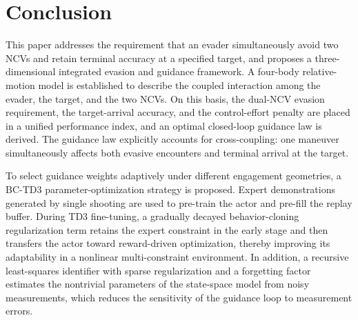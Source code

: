 %
\section{Conclusion}
This paper addresses the requirement that an evader simultaneously avoid two NCVs and retain terminal accuracy at a specified target, and proposes a three-dimensional integrated evasion and guidance framework. A four-body relative-motion model is established to describe the coupled interaction among the evader, the target, and the two NCVs. On this basis, the dual-NCV evasion requirement, the target-arrival accuracy, and the control-effort penalty are placed in a unified performance index, and an optimal closed-loop guidance law is derived. The guidance law explicitly accounts for cross-coupling: one maneuver simultaneously affects both evasive encounters and terminal arrival at the target.

To select guidance weights adaptively under different engagement geometries, a BC-TD3 parameter-optimization strategy is proposed. Expert demonstrations generated by single shooting are used to pre-train the actor and pre-fill the replay buffer. During TD3 fine-tuning, a gradually decayed behavior-cloning regularization term retains the expert constraint in the early stage and then transfers the actor toward reward-driven optimization, thereby improving its adaptability in a nonlinear multi-constraint environment. In addition, a recursive least-squares identifier with sparse regularization and a forgetting factor estimates the nontrivial parameters of the state-space model from noisy measurements, which reduces the sensitivity of the guidance loop to measurement errors.

